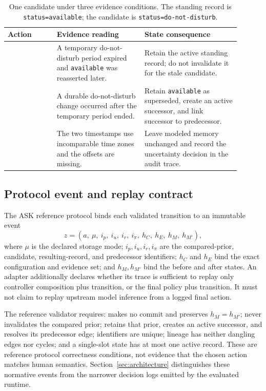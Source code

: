 \begin{table}[t]
\centering
\small
\caption{One candidate under three evidence conditions. The standing record is
\texttt{status=available}; the candidate is \texttt{status=do-not-disturb}.}
\label{tab:action-example}
\begin{tabular}{@{}p{0.19\linewidth}p{0.34\linewidth}p{0.37\linewidth}@{}}
\toprule
Action & Evidence reading & State consequence \\
\midrule
\keep{} & A temporary do-not-disturb period expired and
\texttt{available} was reasserted later. & Retain the active standing record;
do not invalidate it for the stale candidate. \\
\supersede{} & A durable do-not-disturb change occurred after the temporary
period ended. & Retain \texttt{available} as superseded, create an active
successor, and link successor to predecessor. \\
\abstain{} & The two timestamps use incomparable time zones and the offsets are
missing. & Leave modeled memory unchanged and record the uncertainty decision
in the audit trace. \\
\bottomrule
\end{tabular}
\end{table}

\subsection{Protocol event and replay contract}

The ASK reference protocol binds each validated transition to an immutable event
\[
z=(a,\ \mu,\ i_p,\ i_u,\ i_r,\ i_{\pi},\ h_C,\ h_E,\ h_M,\ h_{M'}),
\]
where $\mu$ is the
declared storage mode; $i_p,i_u,i_r,i_{\pi}$ are the compared-prior,
candidate, resulting-record, and predecessor identifiers; $h_C$ and $h_E$ bind
the exact configuration and evidence set; and $h_M,h_{M'}$ bind the before and
after states. An adapter additionally declares whether its trace is sufficient
to replay only controller composition plus transition, or the final policy plus
transition. It must not claim to replay upstream model inference from a logged
final action.

The reference validator requires: \abstain{} makes no commit and preserves
$h_M=h_{M'}$; \keep{} never invalidates the compared prior; \supersede{}
retains that prior, creates an active successor, and resolves its predecessor
edge; identifiers are unique; lineage has neither dangling edges nor cycles;
and a single-slot state has at most one active record. These are reference
protocol correctness conditions, not evidence that the chosen action matches
human semantics. Section~\ref{sec:architecture} distinguishes these normative
events from the narrower decision logs emitted by the evaluated runtime.


